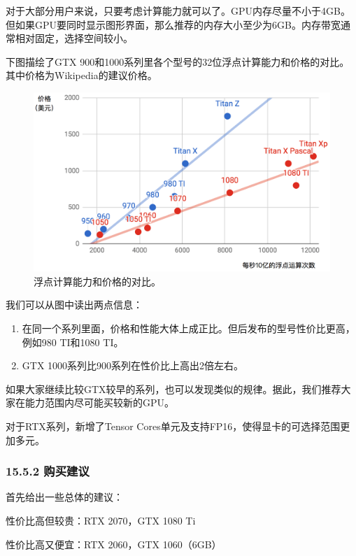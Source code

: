 对于大部分用户来说，只要考虑计算能力就可以了。GPU内存尽量不小于4GB。但如果GPU要同时显示图形界面，那么推荐的内存大小至少为6GB。内存带宽通常相对固定，选择空间较小。

下图描绘了GTX
900和1000系列里各个型号的32位浮点计算能力和价格的对比。其中价格为Wikipedia的建议价格。

\begin{figure}
\centering
\includegraphics{./img/ch15/gtx.png}
\caption{浮点计算能力和价格的对比。}
\end{figure}

我们可以从图中读出两点信息：

\begin{enumerate}
\def\labelenumi{\arabic{enumi}.}
\item
  在同一个系列里面，价格和性能大体上成正比。但后发布的型号性价比更高，例如980
  TI和1080 TI。
\item
  GTX 1000系列比900系列在性价比上高出2倍左右。
\end{enumerate}

如果大家继续比较GTX较早的系列，也可以发现类似的规律。据此，我们推荐大家在能力范围内尽可能买较新的GPU。

对于RTX系列，新增了Tensor
Cores单元及支持FP16，使得显卡的可选择范围更加多元。

\subsubsection{15.5.2 购买建议}\label{ux8d2dux4e70ux5efaux8bae}

首先给出一些总体的建议：

性价比高但较贵：RTX 2070，GTX 1080 Ti

性价比高又便宜：RTX 2060，GTX 1060（6GB）

